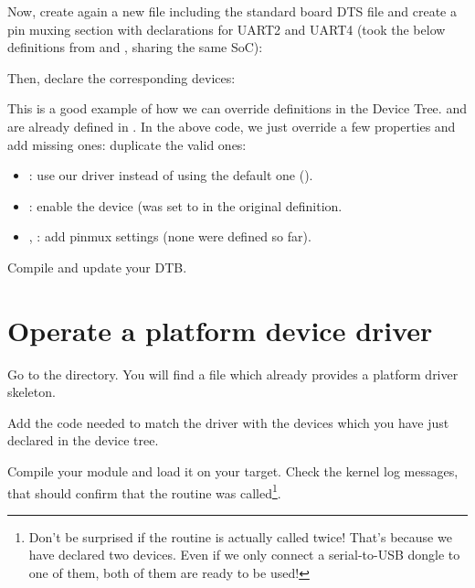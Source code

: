 Now, create again a new
 file including
the standard board DTS file and create a pin muxing section with
declarations for UART2 and UART4 (took the below definitions from
 and
, sharing the same
SoC):

{\scriptsize {}}

Then, declare the corresponding devices:


This is a good example of how we can override definitions in the Device
Tree.  and  are already defined in
. In the above code, we just
override a few properties and add missing ones:
duplicate the valid ones:

\begin{itemize}
\item {}: use our driver instead of using the default one
      ().
\item {}: enable the device (was set to  in
      the original definition.
\item {}, : add pinmux settings
      (none were defined so far).
\end{itemize}

Compile and update your DTB.

\section{Operate a platform device driver}

Go to the  directory.
You will find a  file which already provides a platform
driver skeleton.

Add the code needed to match the driver with the devices which you have
just declared in the device tree.

Compile your module and load it on your target. Check the kernel log
messages, that should confirm that the  routine was
called\footnote{Don't be surprised if the  routine is
actually called twice! That's because we have declared two devices.
Even if we only connect a serial-to-USB dongle to one of them, both
of them are ready to be used!}.

